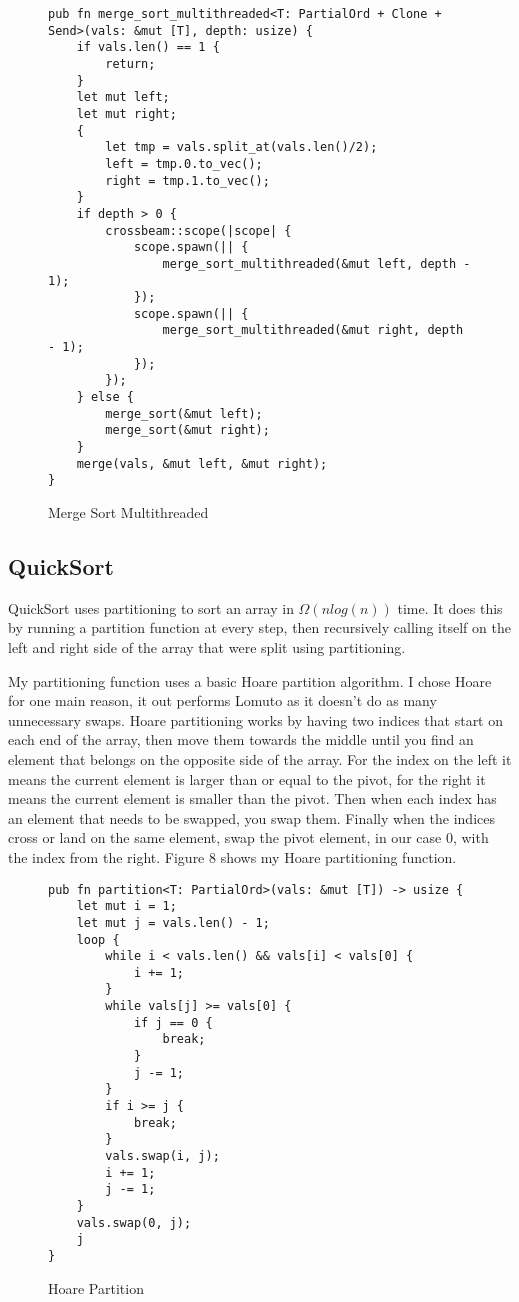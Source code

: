 \documentclass[12pt,letterpaper]{report}
\begin{document}
	\begin{figure}[H]
    \begin{verbatim}
pub fn merge_sort_multithreaded<T: PartialOrd + Clone + Send>(vals: &mut [T], depth: usize) {
    if vals.len() == 1 {
        return;
    }
    let mut left;
    let mut right;
    {
        let tmp = vals.split_at(vals.len()/2);
        left = tmp.0.to_vec();
        right = tmp.1.to_vec();
    }
    if depth > 0 {
        crossbeam::scope(|scope| {
            scope.spawn(|| {
                merge_sort_multithreaded(&mut left, depth - 1);
            });
            scope.spawn(|| {
                merge_sort_multithreaded(&mut right, depth - 1);
            });
        });
    } else {
        merge_sort(&mut left);
        merge_sort(&mut right);
    }
    merge(vals, &mut left, &mut right);
}
    \end{verbatim}
    \caption{Merge Sort Multithreaded}
\end{figure}
	
	\subsection*{QuickSort}
	
	QuickSort\cite{quick_sort} uses partitioning to sort an array in $\Omega(nlog(n))$ time. It does this by running a partition function at every step, then recursively calling itself on the left and right side of the array that were split using partitioning.
	
	My partitioning function uses a basic Hoare partition algorithm. I chose Hoare for one main reason, it out performs Lomuto as it doesn't do as many unnecessary swaps. Hoare partitioning works by having two indices that start on each end of the array, then move them towards the middle until you find an element that belongs on the opposite side of the array. For the index on the left it means the current element is larger than or equal to the pivot, for the right it means the current element is smaller than the pivot. Then when each index has an element that needs to be swapped, you swap them. Finally when the indices cross or land on the same element, swap the pivot element, in our case 0, with the index from the right. Figure 8 shows my Hoare partitioning function.
	
	\begin{figure}[H]
    \begin{verbatim}
pub fn partition<T: PartialOrd>(vals: &mut [T]) -> usize {
    let mut i = 1;
    let mut j = vals.len() - 1;
    loop {
        while i < vals.len() && vals[i] < vals[0] {
            i += 1;
        }
        while vals[j] >= vals[0] {
            if j == 0 {
                break;
            }
            j -= 1;
        }
        if i >= j {
            break;
        }
        vals.swap(i, j);
        i += 1;
        j -= 1;
    }
    vals.swap(0, j);
    j
}
    \end{verbatim}
    \caption{Hoare Partition}
\end{figure}
\end{document}
